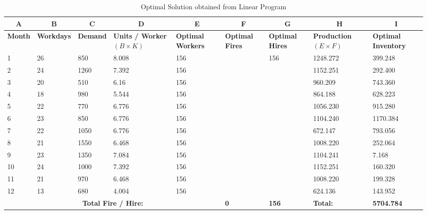\documentclass[12pt]{article}
\begin{document}
\begin{table}[H]
    \centering
    \begin{adjustbox}{width=\textwidth}
    \begin{tabular}{|l||l|p{1.8cm}|p{1.8cm}|p{1.8cm}|p{1.8cm}|p{2.2cm}|p{1.8cm}|p{2.2cm}|}
    \hline
    \multicolumn{1}{|c||}{\textbf{A}} & \multicolumn{1}{c}{\textbf{B}}& \multicolumn{1}{|c}{\textbf{C}}& \multicolumn{1}{|c}{\textbf{D}}& \multicolumn{1}{|c}{\textbf{E}}& \multicolumn{1}{|c}{\textbf{F}}& \multicolumn{1}{|c}{\textbf{G}}& \multicolumn{1}{|c}{\textbf{H}}&\multicolumn{1}{|c|}{\textbf{I}} \\ \hline \hline 
        \textbf{Month} & \textbf{Workdays} & \textbf{Demand} & \textbf{Units / Worker $(B \times K)$} & \textbf{Optimal Workers} & \textbf{Optimal Fires} & \textbf{Optimal Hires} & \textbf{Production $(E\times F)$} & \textbf{Optimal Inventory} \\ \hline
        1 & 26 & 850 & 8.008 & 156 & ~ & 156 & 1248.272 & 399.248 \\ \hline
        2 & 24 & 1260& 7.392 & 156 & ~ & ~ & 1152.251 & 292.400 \\ \hline
        3 & 20 & 510 & 6.16 & 156 & ~ & ~ & 960.209 & 743.360 \\ \hline
        4 & 18 & 980 & 5.544 & 156 & ~ & ~ & 864.188 & 628.223 \\ \hline
        5 & 22 & 770 & 6.776 & 156 & ~ & ~ & 1056.230 & 915.280 \\ \hline
        6 & 23 & 850 & 6.776 & 156 & ~ & ~ & 1104.240 & 1170.384 \\ \hline
        7 & 22 & 1050 & 6.776 & 156 & ~ & ~ & 672.147 & 793.056 \\ \hline
        8 & 21 & 1550 & 6.468 & 156 & ~ & ~ & 1008.220 & 252.064 \\ \hline
        9 & 23 & 1350 & 7.084 & 156 & ~ & ~ & 1104.241 & 7.168 \\ \hline
        10 & 24 & 1000 & 7.392 & 156 & ~ & ~ & 1152.251 & 160.320\\ \hline
        11 & 21 & 970 & 6.468 & 156 & ~ & ~ & 1008.220 & 199.328 \\ \hline
        12 & 13 & 680& 4.004 & 156 & ~ & ~ & 624.136 & 143.952 \\ \hline \hline 
        \multicolumn{5}{|c|}{\textbf{Total Fire / Hire:}} & \textbf{0} & \textbf{156} & \multicolumn{1}{||p{2.3cm}|}{\textbf{Total:}} & \textbf{5704.784} \\ \hline
    \end{tabular}
    \end{adjustbox}
    \caption{Optimal Solution obtained from Linear Program}
    \label{tab:1c-ip}
\end{table} 
\end{document}
